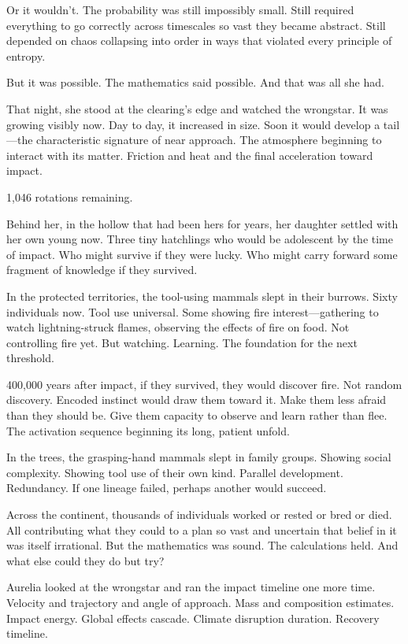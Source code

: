 Or it wouldn't. The probability was still impossibly small. Still required everything to go correctly across timescales so vast they became abstract. Still depended on chaos collapsing into order in ways that violated every principle of entropy.

But it was possible. The mathematics said possible. And that was all she had.

\scenebreak

That night, she stood at the clearing's edge and watched the wrongstar. It was growing visibly now. Day to day, it increased in size. Soon it would develop a tail—the characteristic signature of near approach. The atmosphere beginning to interact with its matter. Friction and heat and the final acceleration toward impact.

1,046 rotations remaining.

Behind her, in the hollow that had been hers for years, her daughter settled with her own young now. Three tiny hatchlings who would be adolescent by the time of impact. Who might survive if they were lucky. Who might carry forward some fragment of knowledge if they survived.

In the protected territories, the tool-using mammals slept in their burrows. Sixty individuals now. Tool use universal. Some showing fire interest—gathering to watch lightning-struck flames, observing the effects of fire on food. Not controlling fire yet. But watching. Learning. The foundation for the next threshold.

400,000 years after impact, if they survived, they would discover fire. Not random discovery. Encoded instinct would draw them toward it. Make them less afraid than they should be. Give them capacity to observe and learn rather than flee. The activation sequence beginning its long, patient unfold.

In the trees, the grasping-hand mammals slept in family groups. Showing social complexity. Showing tool use of their own kind. Parallel development. Redundancy. If one lineage failed, perhaps another would succeed.

Across the continent, thousands of individuals worked or rested or bred or died. All contributing what they could to a plan so vast and uncertain that belief in it was itself irrational. But the mathematics was sound. The calculations held. And what else could they do but try?

Aurelia looked at the wrongstar and ran the impact timeline one more time. Velocity and trajectory and angle of approach. Mass and composition estimates. Impact energy. Global effects cascade. Climate disruption duration. Recovery timeline.

